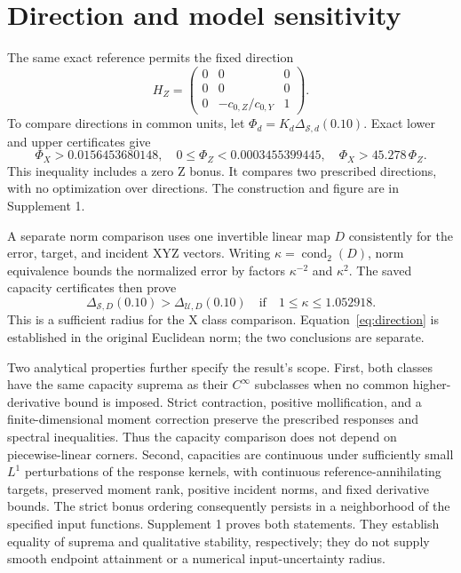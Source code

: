 \documentclass{optica-article}
\begin{document}
\section{Direction and model sensitivity}
The same exact reference permits the fixed direction
\begin{equation}
 H_Z=\begin{pmatrix}0&0&0\\0&0&0\\0&-c_{0,Z}/c_{0,Y}&1\end{pmatrix}.
\end{equation}
To compare directions in common units, let $\Phi_d=K_d\Delta_{\mathcal S,d}(0.10)$. Exact lower and upper certificates give
\begin{equation}
 \Phi_X>0.0156453680148,\quad
 0\leq\Phi_Z<0.0003455399445,\quad
 \Phi_X>45.278\,\Phi_Z.
 \label{eq:direction}
\end{equation}
This inequality includes a zero Z bonus. It compares two prescribed directions, with no optimization over directions. The construction and figure are in Supplement 1.

A separate norm comparison uses one invertible linear map $D$ consistently for the error, target, and incident XYZ vectors. Writing $\kappa=\operatorname{cond}_2(D)$, norm equivalence bounds the normalized error by factors $\kappa^{-2}$ and $\kappa^2$. The saved capacity certificates then prove
\begin{equation}
 \Delta_{\mathcal S,D}(0.10)>\Delta_{\mathcal U,D}(0.10)
 \quad\text{if}\quad 1\leq\kappa\leq1.052918.
 \label{eq:norm}
\end{equation}
This is a sufficient radius for the X class comparison. Equation~\eqref{eq:direction} is established in the original Euclidean norm; the two conclusions are separate.

Two analytical properties further specify the result's scope. First, both classes have the same capacity suprema as their $C^\infty$ subclasses when no common higher-derivative bound is imposed. Strict contraction, positive mollification, and a finite-dimensional moment correction preserve the prescribed responses and spectral inequalities. Thus the capacity comparison does not depend on piecewise-linear corners. Second, capacities are continuous under sufficiently small $L^1$ perturbations of the response kernels, with continuous reference-annihilating targets, preserved moment rank, positive incident norms, and fixed derivative bounds. The strict bonus ordering consequently persists in a neighborhood of the specified input functions. Supplement 1 proves both statements. They establish equality of suprema and qualitative stability, respectively; they do not supply smooth endpoint attainment or a numerical input-uncertainty radius.
\end{document}
